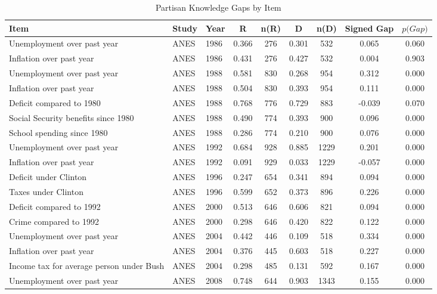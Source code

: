 \begingroup\tiny
\begin{longtable}{lllcccccc}
\caption{Partisan Knowledge Gaps by Item} \\ 
  \hline
Item & Study & Year & R & n(R) & D & n(D) & Signed Gap & $\textit{p(Gap)}$ \\ 
  \hline
Unemployment over past year & ANES & 1986 & 0.366 &  276 & 0.301 &  532 & 0.065 & 0.060 \\ 
  Inflation over past year & ANES & 1986 & 0.431 &  276 & 0.427 &  532 & 0.004 & 0.903 \\ 
  Unemployment over past year & ANES & 1988 & 0.581 &  830 & 0.268 &  954 & 0.312 & 0.000 \\ 
  Inflation over past year & ANES & 1988 & 0.504 &  830 & 0.393 &  954 & 0.111 & 0.000 \\ 
  Deficit compared to 1980 & ANES & 1988 & 0.768 &  776 & 0.729 &  883 & -0.039 & 0.070 \\ 
  Social Security benefits since 1980 & ANES & 1988 & 0.490 &  774 & 0.393 &  900 & 0.096 & 0.000 \\ 
  School spending since 1980 & ANES & 1988 & 0.286 &  774 & 0.210 &  900 & 0.076 & 0.000 \\ 
  Unemployment over past year & ANES & 1992 & 0.684 &  928 & 0.885 & 1229 & 0.201 & 0.000 \\ 
  Inflation over past year & ANES & 1992 & 0.091 &  929 & 0.033 & 1229 & -0.057 & 0.000 \\ 
  Deficit under Clinton & ANES & 1996 & 0.247 &  654 & 0.341 &  894 & 0.094 & 0.000 \\ 
  Taxes under Clinton & ANES & 1996 & 0.599 &  652 & 0.373 &  896 & 0.226 & 0.000 \\ 
  Deficit compared to 1992 & ANES & 2000 & 0.513 &  646 & 0.606 &  821 & 0.094 & 0.000 \\ 
  Crime compared to 1992 & ANES & 2000 & 0.298 &  646 & 0.420 &  822 & 0.122 & 0.000 \\ 
  Unemployment over past year & ANES & 2004 & 0.442 &  446 & 0.109 &  518 & 0.334 & 0.000 \\ 
  Inflation over past year & ANES & 2004 & 0.376 &  445 & 0.603 &  518 & 0.227 & 0.000 \\ 
  Income tax for average person under Bush & ANES & 2004 & 0.298 &  485 & 0.131 &  592 & 0.167 & 0.000 \\ 
  Unemployment over past year & ANES & 2008 & 0.748 &  644 & 0.903 & 1343 & 0.155 & 0.000 \\ 

\end{longtable}
